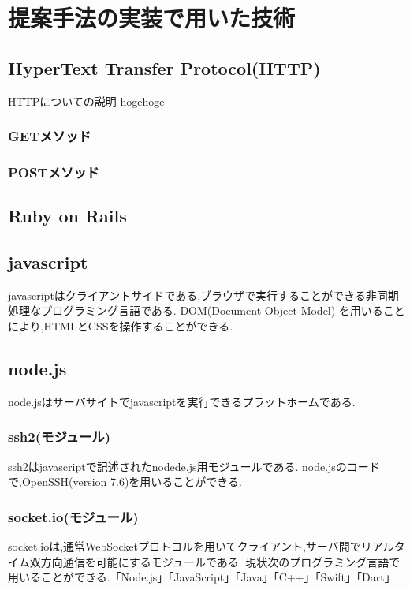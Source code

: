\section{提案手法の実装で用いた技術}
    \subsection{HyperText Transfer Protocol(HTTP)}
        HTTPについての説明 hogehoge
        \subsubsection{GETメソッド}
        \subsubsection{POSTメソッド}
    \subsection{Ruby on Rails}
    \subsection{javascript\cite{javascript}}
    javascriptはクライアントサイドである,ブラウザで実行することができる非同期処理なプログラミング言語である.
    DOM(Document Object Model) を用いることにより,HTMLとCSSを操作することができる.
    \subsection{node.js\cite{node.js}}
        node.jsはサーバサイトでjavascriptを実行できるプラットホームである.
        \subsubsection{ssh2(モジュール)\cite{ssh2-module}}%
            ssh2はjavascriptで記述されたnodede.js用モジュールである.
            node.jsのコードで,OpenSSH(version 7.6)を用いることができる.
        \subsubsection{socket.io(モジュール)\cite{socket.io}}%
            socket.ioは,通常WebSocketプロトコルを用いてクライアント,サーバ間でリアルタイム双方向通信を可能にするモジュールである.
            現状次のプログラミング言語で用いることができる.「Node.js」「JavaScript」「Java」「C++」「Swift」「Dart」 
